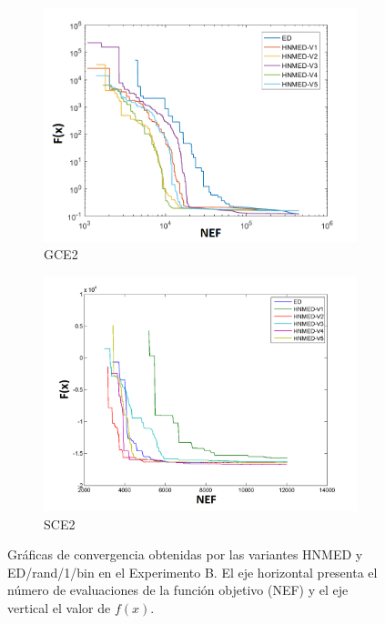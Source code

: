 \begin{figure}
\begin{subfigure}[b]{0.49\linewidth}
		\includegraphics[width=\linewidth]{Figures/B-Grafica_Convergencia_Problema_5}
		\caption{GCE2} \label{fig:G2} 
	\end{subfigure}
	\begin{subfigure}[b]{0.49\linewidth}
		\includegraphics[width=\linewidth]{Figures/B-Grafica_Convergencia_Problema_6}
		\caption{SCE2} \label{fig:S1} 
	\end{subfigure}
	\caption[Gráficas de convergencia obtenidas por las variantes HNMED y ED/rand/1/bin en el Experimento B.]{Gráficas de convergencia obtenidas por las variantes HNMED y ED/rand/1/bin en el Experimento B. El eje horizontal presenta el número de evaluaciones de la función objetivo (NEF) y el eje vertical el valor de  $f(x)$.  } \label{fig: Gráficas de convergencia para las variantes HNMED y ED/rand/1/bin} 
	
\end{figure}
